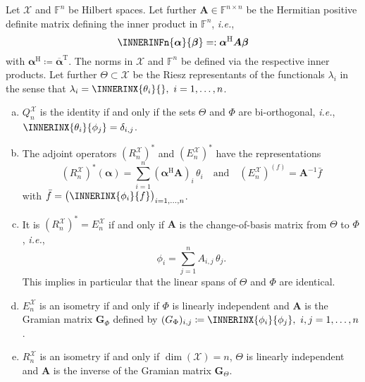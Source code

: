 \documentclass[a4paper]{paper}
\newcommand*{\SPC}[1]{{\ensuremath{\mathscr{#1}}}}
\newcommand*{\SPCX}{\SPC{X}}
\newcommand{\FIELD}{{\ensuremath{\mathbb{F}}}}
\newcommand*{\Fn}{{\ensuremath{\FIELD^n}}}
\newcommand*{\Fnxn}{{\ensuremath{\FIELD^{n \times n}}}}
\newcommand*{\EXT}[2]{\ensuremath{E_{#1}^{#2}}}
\newcommand*{\REST}[2]{\ensuremath{R_{#1}^{#2}}}
\newcommand*{\COPROJ}[2]{\ensuremath{Q_{#1}^{#2}}}
\newcommand*{\RnX}{{\ensuremath{\REST{n}{\SPC{X}}}}}
\newcommand*{\EnX}{{\ensuremath{\EXT{n}{\SPC{X}}}}}
\newcommand*{\QnX}{{\ensuremath{\COPROJ{n}{\SPCX}}}}
\DeclareMathOperator{\DIM}{dim}
\newcommand*{\TRANSP}[1]{{\ensuremath{#1^{\mathrm{T}}}}}
\newcommand*{\HERM}[1]{{\ensuremath{#1^{\mathrm{H}}}}}
\newcommand{\ie}{\textsl{i.e.}\xspace}
\newcommand{\valpha}{\boldsymbol{\alpha}}
\newcommand{\vbeta}{\boldsymbol{\beta}}
\newcommand{\vA}{\boldsymbol{A}}
\newcommand{\vG}{\boldsymbol{G}}
\begin{document}
\begin{lemma}
 \label{lemma:specif:funct:op_prop_hilbert}
 Let $\SPCX$ and $\Fn$ be Hilbert spaces. Let further $\vA \in \Fnxn$ be the Hermitian positive 
 definite matrix defining the inner product in $\Fn$, \ie,
 \begin{equation*}
  \INNERINFn{\valpha}{\vbeta} =: \HERM{\valpha} \vA \vbeta
 \end{equation*}
 with $\HERM{\valpha} \coloneqq  \TRANSP{\overline{\valpha}}$. The norms in $\SPCX$ and $\Fn$ be defined via 
 the respective inner products. Let further $\Theta \subset \SPCX$ be the Riesz representants of the functionals 
 $\lambda_i$ in the sense that $\lambda_i = \INNERINX{\theta_i}{},\ i=1,\dotsc,n$.
 \begin{enumerate}[(a)]
  \item \label{lemma:specif:funct:op_prop_hilbert:Q_identity}
  $\QnX$ is the identity if and only if the sets $\Theta$ and $\Phi$ are bi-orthogonal, \ie, 
  $\INNERINX{\theta_i}{\phi_j} = \delta_{i,j}$.
 
  \item \label{lemma:specif:funct:op_prop_hilbert:R_adjoint_repr}
  The adjoint operators $(\RnX)^*$ and $(\EnX)^*$ have the representations
  \begin{equation*}
   (\RnX)^*(\valpha) = \sum_{i=1}^n (\HERM{\valpha}\vA)_i\, \theta_i
   \quad \text{and} \quad
   (\EnX)^(f) = \vA^{-1} \bar f
  \end{equation*}
  with $\bar f = \big( \INNERINX{\phi_i}{f} \big)_{i=1,\dotsc,n}$.
  
  \item \label{lemma:specif:funct:op_prop_hilbert:adjoint_relation}
  It is $(\RnX)^* = \EnX$ if and only if $\vA$ is the change-of-basis matrix from $\Theta$ to $\Phi$, \ie,
  \begin{equation*}
   \phi_i = \sum_{j=1}^n A_{i,j}\, \theta_j.
  \end{equation*}
  This implies in particular that the linear spans of $\Theta$ and $\Phi$ are identical.
 
  \item  \label{lemma:specif:funct:op_prop_hilbert:E_isometry}
  $\EnX$ is an isometry if and only if $\Phi$ is linearly independent and $\vA$ is the Gramian matrix $\vG_\Phi$ 
  defined by $(G_\Phi)_{i,j} \coloneqq  \INNERINX{\phi_i}{\phi_j},\ i,j=1,\dotsc,n$.
  
  \item \label{lemma:specif:funct:op_prop_hilbert:R_isometry}
  $\RnX$ is an isometry if and only if $\DIM(\SPCX) = n$, $\Theta$ is linearly independent and $\vA$ is the 
  inverse of the Gramian matrix $\vG_\Theta$.
 \end{enumerate}
\end{lemma}
\vspace{1em}
\end{document}
